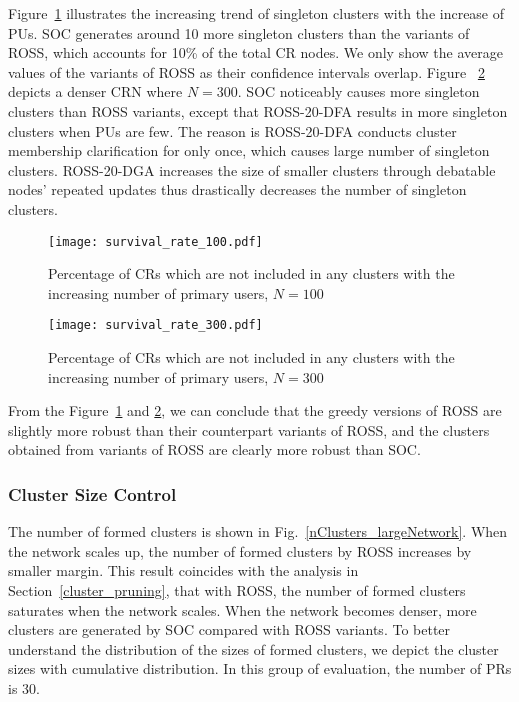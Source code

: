 \documentclass[10pt,journal,compsoc]{IEEEtran}
\theoremstyle{mytheoremstyle}
\theoremstyle{mytheoremstyle}
\theoremstyle{mytheoremstyle}
\begin{document}
Figure~\ref{singleton_clusters_100} illustrates the increasing trend of singleton clusters with the increase of PUs.
SOC generates around 10 more singleton clusters than the variants of ROSS, which accounts for 10\% of the total CR nodes.
We only show the average values of the variants of ROSS as their confidence intervals overlap.
%
Figure ~\ref{singleton_clusters_300} depicts a denser CRN where $N=300$.
SOC noticeably causes more singleton clusters than ROSS variants, except that ROSS-20-DFA results in more singleton clusters when PUs are few.
The reason is ROSS-20-DFA conducts cluster membership clarification for only once, which causes large number of singleton clusters.
ROSS-20-DGA increases the size of smaller clusters through debatable nodes' repeated updates thus drastically decreases the number of singleton clusters.

\begin{figure}[!h]
  \centering
  \texttt{[image: survival\_rate\_100.pdf]}
  \caption{Percentage of CRs which are not included in any clusters with the increasing number of primary users, $N=100$}
  \label{singleton_clusters_100}
\end{figure}
  
  \begin{figure}[!h]
    \centering
   \texttt{[image: survival\_rate\_300.pdf]}
  \caption{Percentage of CRs which are not included in any clusters with the increasing number of primary users, $N=300$}
  \label{singleton_clusters_300}
\end{figure}

From the Figure~\ref{singleton_clusters_100} and \ref{singleton_clusters_300}, we can conclude that the greedy versions of ROSS are slightly more robust than their counterpart variants of ROSS, and the clusters obtained from variants of ROSS are clearly more robust than SOC. 


\subsubsection{Cluster Size Control}

The number of formed clusters is shown in Fig.~\ref{nClusters_largeNetwork}.
When the network scales up, the number of formed clusters by ROSS increases by smaller margin.
This result coincides with the analysis in Section~\ref{cluster_pruning}, that with ROSS, the number of formed clusters saturates when the network scales.
When the network becomes denser, more clusters are generated by SOC compared with ROSS variants.
To better understand the distribution of the sizes of formed clusters, we depict the cluster sizes with cumulative distribution.
In this group of evaluation, the number of PRs is 30.
\end{document}
